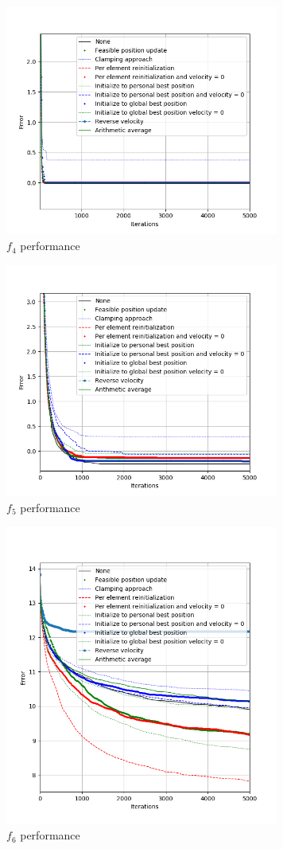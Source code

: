 \documentclass[conference]{IEEEtran}
\begin{document}
\begin{figure}[htbp]
\centerline{\includegraphics[width=90mm]{images/results/Quartic.png}}
\caption{$f_4$ performance}
\label{fig:quartic}
\end{figure}

\begin{figure}[htbp]
\centerline{\includegraphics[width=90mm]{images/results/Salomon.png}}
\caption{$f_5$ performance}
\label{fig:salomon}
\end{figure}

\begin{figure}[htbp]
\centerline{\includegraphics[width=90mm]{images/results/SchafferF6.png}}
\caption{$f_6$ performance}
\label{fig:schafferf6}
\end{figure}
\end{document}
